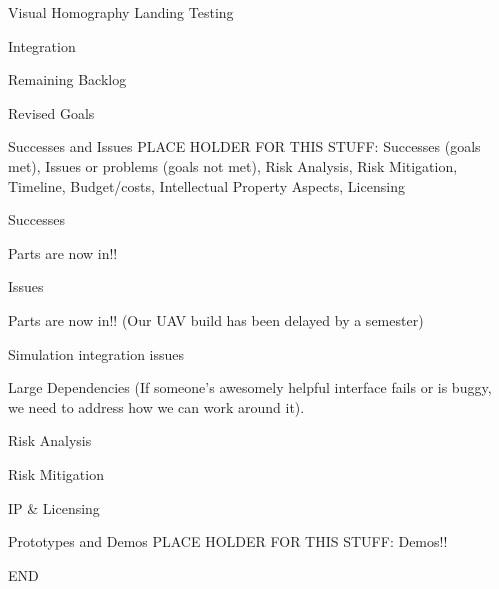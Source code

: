 \documentclass[11pt]{beamer}
\begin{document}
\begin{frame}{Visual Homography Landing Testing}

\end{frame}

\begin{frame}{Integration}

\end{frame}


\begin{frame}{Remaining Backlog}

\end{frame}


\begin{frame}{Revised Goals}

\end{frame}




\begin{frame}{Successes and Issues}
PLACE HOLDER FOR THIS STUFF:
Successes (goals met), Issues or problems (goals not met), Risk Analysis, Risk Mitigation, Timeline,
Budget/costs, Intellectual Property Aspects, Licensing
\end{frame}

\begin{frame}{Successes}

Parts are now in!!



\end{frame}

\begin{frame}{Issues}

Parts are now in!! (Our UAV build has been delayed by a semester)

Simulation integration issues

Large Dependencies (If someone's awesomely helpful interface fails or is buggy, we need to address how we can work around it).

\end{frame}

\begin{frame}{Risk Analysis}

\end{frame}

\begin{frame}{Risk Mitigation}

\end{frame}

\begin{frame}{IP \& Licensing}

\end{frame}



\begin{frame}{Prototypes and Demos}
PLACE HOLDER FOR THIS STUFF:
Demos!!
\end{frame}

\begin{frame}{ END}
\end{frame}
\end{document}
